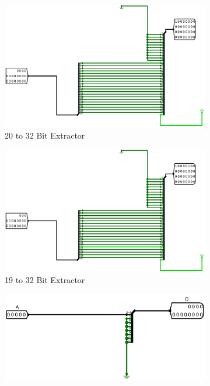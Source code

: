 \documentclass[12pt]{article}
\begin{document}
\begin{figure}[H]
    \centering
    \begin{subfigure}[b]{0.45\textwidth}
        \includegraphics[width=\textwidth]{Images/20to32.png}
        \caption{20 to 32 Bit Extractor}
        \label{fig:20t32}
    \end{subfigure}
    \begin{subfigure}[b]{0.45\textwidth}
        \includegraphics[width=\textwidth]{Images/19to32.png}
        \caption{19 to 32 Bit Extractor}
        \label{fig:19t32}
    \end{subfigure}
    \newline
    \newline
    \begin{subfigure}[b]{0.45\textwidth}
        \includegraphics[width=\textwidth]{Images/5to12.png}

\end{subfigure}
\end{figure}
\end{document}

